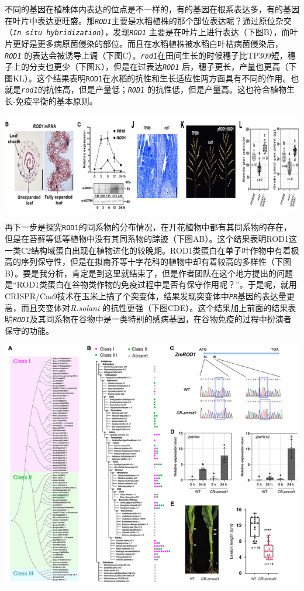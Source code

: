 \documentclass[
  10pt,
]{book}
\begin{document}
不同的基因在植株体内表达的位点是不一样的，有的基因在根系表达多，有的基因在叶片中表达更旺盛。那\emph{\texttt{ROD1}}主要是水稻植株的那个部位表达呢？通过原位杂交（\emph{\texttt{In\ situ\ hybridization}}），发现\emph{\texttt{ROD1}} 主要是在叶片上进行表达（下图B），而叶片更好是更多病原菌侵染的部位。而且在水稻植株被水稻白叶枯病菌侵染后，\emph{\texttt{ROD1}} 的表达会被诱导上调（下图C）。\emph{\texttt{rod1}}在田间生长的时候穗子比TP309短，穗子上的分支也更少（下图K），但是在过表达\emph{\texttt{ROD1}} 后，穗子更长，产量也更高（下图KL）。这个结果表明\texttt{ROD1}在水稻的抗性和生长适应性两方面具有不同的作用。也就是\emph{\texttt{rod1}}的抗性高，但是产量低；\emph{\texttt{ROD1}} 的抗性低，但是产量高。这也符合植物生长-免疫平衡的基本原则。

\includegraphics{figures/HeZuhuaCell2021/5.png}

再下一步是探究\texttt{ROD1}的同系物的分布情况，在开花植物中都有其同系物的存在，但是在苔藓等低等植物中没有其同系物的踪迹（下图AB）。这个结果表明ROD1这一类C2结构域蛋白出现在植物进化的较晚期。ROD1类蛋白在单子叶作物中有着极高的序列保守性，但是在拟南芥等十字花科的植物中却有着较高的多样性（下图B）。要是我分析，肯定是到这里就结束了，但是作者团队在这个地方提出的问题是``ROD1类蛋白在谷物类作物的免疫过程中是否有保守作用呢？''。于是呢，就用CRISPR/Cas9技术在玉米上搞了个突变体，结果发现突变体中\emph{\texttt{PR}}基因的表达量更高，而且突变体对\emph{R.solani} 的抗性更强（下图CDE）。这个结果加上前面的结果表明\emph{\texttt{ROD1}}及其同系物在谷物中是一类特别的感病基因，在谷物免疫的过程中扮演者保守的功能。

\includegraphics{figures/HeZuhuaCell2021/6.png}
\end{document}
